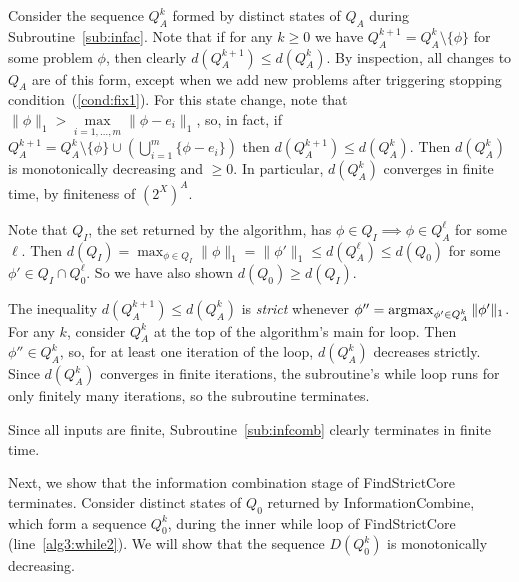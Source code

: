 \documentclass[11pt,reqno]{amsart}
\theoremstyle{definition}
\numberwithin{equation}{section}
\newcommand{\lft}{\left(}
\newcommand{\rt}{\right)}
\newcommand{\argmax}{\operatornamewithlimits{argmax}}
\newcommand{\pre}{\phi}
\newcommand{\prealloc}{(2^X)^A}
\newcommand{\acto}{Q_0}
\newcommand{\actok}{Q_0^k}
\newcommand{\acta}{Q_A}
\newcommand{\actak}{Q_A^k}
\newcommand{\actc}{Q_I}
\newcommand{\disto}{d}
\newcommand{\distt}{D}
\begin{document}
Consider the sequence $\actak$ formed by distinct states of $\acta$ during Subroutine~\ref{sub:infac}.
Note that if for any $k\geq 0$ we have $\acta^{k+1} = \actak \setminus \{\pre\}$ for some problem $\pre$, then clearly $\disto(\acta^{k+1}) \leq \disto(\actak)$.
By inspection, all changes to $\acta$ are of this form, except when we add new problems after triggering stopping condition~(\ref{cond:fix1}).
For this state change, note that $\|\pre\|_1 > \max\limits_{i = 1,\hdots,m} \|\pre - e_i\|_1$, so, in fact, if $\acta^{k+1} = \actak \setminus \{\pre\} \cup \lft \bigcup_{i =1}^m \{\pre - e_i \} \rt$ then $\disto(\acta^{k+1}) \leq \disto(\actak)$. 
Then $\disto(\actak)$ is monotonically decreasing and $\geq 0$.
In particular, $\disto(\actak)$ converges in finite time, by finiteness of $\prealloc$.

Note that $\actc$, the set returned by the algorithm, has $\pre \in \actc \implies \pre \in \acta^{\ell}$ for some $\ell$.
Then $\disto(\actc) = \max_{\pre\in\actc} \|\pre\|_1 = \|\pre'\|_1 \leq \disto(\acta^{\ell}) \leq \disto(\acto)$ for some $\pre' \in \actc \cap \acto^{\ell}$.
So we have also shown $\disto(\acto) \geq \disto(\actc)$.

The inequality $\disto(\acta^{k+1}) \leq \disto(\actak)$ is \emph{strict} whenever $\pre'' = \argmax_{\pre' \in \actak} \|\pre'\|_1$. 
For any $k$, consider $\actak$ at the top of the algorithm's main for loop. 
Then $\pre'' \in \actak$, so, for at least one iteration of the loop, $\disto(\actak)$ decreases strictly.
Since $\disto(\actak)$ converges in finite iterations, the subroutine's while loop runs for only finitely many iterations, so the subroutine terminates.

Since all inputs are finite, Subroutine~\ref{sub:infcomb} clearly terminates in finite time.

Next, we show that the information combination stage of FindStrictCore terminates.
Consider distinct states of $\acto$ returned by InformationCombine, which form a sequence $\actok$, during the inner while loop of FindStrictCore (line~\ref{alg3:while2}).
We will show that the sequence $\distt(\actok)$ is monotonically decreasing.
\end{document}

